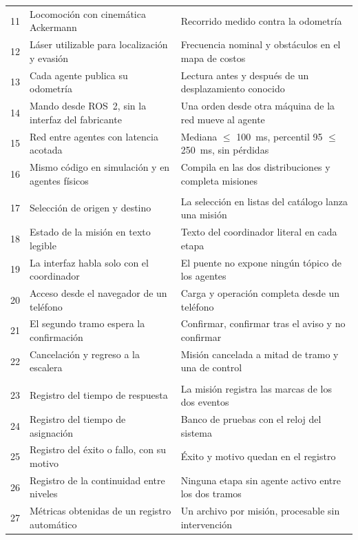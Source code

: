 \begin{table}[H]
\begin{tabular}{@{}c>{\raggedright\arraybackslash}p{}>{\raggedright\arraybackslash}p{}@{}}
    11 & Locomoción con cinemática Ackermann & Recorrido medido contra la odometría \\
    12 & Láser utilizable para localización y evasión & Frecuencia nominal y obstáculos en el mapa de costos \\
    13 & Cada agente publica su odometría & Lectura antes y después de un desplazamiento conocido \\
    14 & Mando desde ROS~2, sin la interfaz del fabricante & Una orden desde otra máquina de la red mueve al agente \\
    15 & Red entre agentes con latencia acotada & Mediana $\leq$ 100~ms, percentil 95 $\leq$ 250~ms, sin pérdidas \\
    16 & Mismo código en simulación y en agentes físicos & Compila en las dos distribuciones y completa misiones \\ \addlinespace
    \multicolumn{3}{@{}l}{\textit{Tercer objetivo específico: interfaz móvil}} \\
    17 & Selección de origen y destino & La selección en listas del catálogo lanza una misión \\
    18 & Estado de la misión en texto legible & Texto del coordinador literal en cada etapa \\
    19 & La interfaz habla solo con el coordinador & El puente no expone ningún tópico de los agentes \\
    20 & Acceso desde el navegador de un teléfono & Carga y operación completa desde un teléfono \\
    21 & El segundo tramo espera la confirmación & Confirmar, confirmar tras el aviso y no confirmar \\
    22 & Cancelación y regreso a la escalera & Misión cancelada a mitad de tramo y una de control \\ \addlinespace
    \multicolumn{3}{@{}l}{\textit{Cuarto objetivo específico: evaluación experimental}} \\
    23 & Registro del tiempo de respuesta & La misión registra las marcas de los dos eventos \\
    24 & Registro del tiempo de asignación & Banco de pruebas con el reloj del sistema \\
    25 & Registro del éxito o fallo, con su motivo & Éxito y motivo quedan en el registro \\
    26 & Registro de la continuidad entre niveles & Ninguna etapa sin agente activo entre los dos tramos \\
    27 & Métricas obtenidas de un registro automático & Un archivo por misión, procesable sin intervención \\

\end{tabular}
\end{table}

